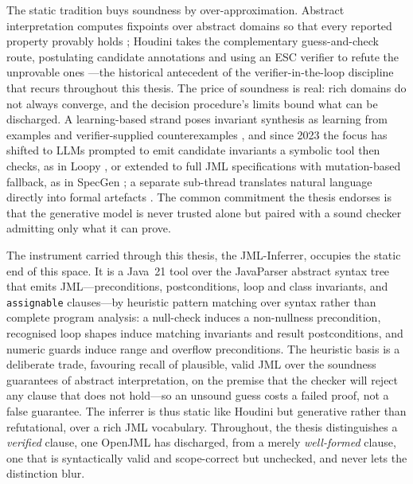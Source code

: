 The static tradition buys soundness by over-approximation. Abstract interpretation
computes fixpoints over abstract domains so that every reported property provably
holds \cite{cousot1977abstract}; Houdini takes the complementary guess-and-check
route, postulating candidate annotations and using an ESC verifier to refute the
unprovable ones \cite{flanagan2001houdini}---the historical antecedent of the
verifier-in-the-loop discipline that recurs throughout this thesis. The price of
soundness is real: rich domains do not always converge, and the decision
procedure's limits bound what can be discharged. A learning-based strand poses
invariant synthesis as learning from examples and verifier-supplied counterexamples
\cite{garg2014ice,si2018learning}, and since 2023 the focus has shifted to LLMs
prompted to emit candidate invariants a symbolic tool then checks, as in Loopy
\cite{kamath2023loopy}, or extended to full JML specifications with mutation-based
fallback, as in SpecGen \cite{ma2025specgen}; a separate sub-thread translates
natural language directly into formal artefacts
\cite{cosler2023nl2spec,endres2024nl2postcond,lahiri2025nl2contract}. The common
commitment the thesis endorses is that the generative model is never trusted alone
but paired with a sound checker admitting only what it can prove.

The instrument carried through this thesis, the JML-Inferrer, occupies the static
end of this space. It is a Java~21 tool over the JavaParser abstract syntax tree
that emits JML---preconditions, postconditions, loop and class invariants, and
\texttt{assignable} clauses---by heuristic pattern matching over syntax rather than
complete program analysis: a null-check induces a non-nullness precondition,
recognised loop shapes induce matching invariants and result postconditions, and
numeric guards induce range and overflow preconditions. The heuristic basis is a
deliberate trade, favouring recall of plausible, valid JML over the soundness
guarantees of abstract interpretation, on the premise that the checker will reject
any clause that does not hold---so an unsound guess costs a failed proof, not a
false guarantee. The inferrer is thus static like Houdini but generative rather than
refutational, over a rich JML vocabulary. Throughout, the thesis distinguishes a
\emph{verified} clause, one OpenJML has discharged, from a merely \emph{well-formed}
clause, one that is syntactically valid and scope-correct but unchecked, and never
lets the distinction blur.

